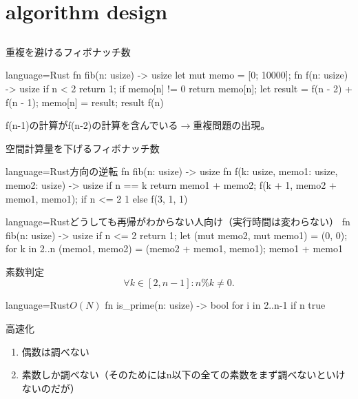 \documentclass{beamer}
\begin{document}
\section{algorithm design}		%
\subsection{}


\begin{frame}[fragile]{重複を避ける}{フィボナッチ数}
\begin{codeof}{language=Rust}{}
fn fib(n: usize) -> usize {
    let mut memo = [0; 10000];
    fn f(n: usize) -> usize {
        if n < 2 { return 1; }
        if memo[n] != 0 { return memo[n]; }
        let result = f(n - 2) + f(n - 1);
        memo[n] = result;
        result
    }
    f(n)
}
\end{codeof}
f(n-1)の計算がf(n-2)の計算を含んでいる$\to$重複問題の出現。

\end{frame}

\begin{frame}[fragile]{空間計算量を下げる}{フィボナッチ数}
\begin{codeof}{language=Rust}{方向の逆転}
fn fib(n: usize) -> usize {
    fn f(k: usize, memo1: usize, memo2: usize) -> usize{
        if n == k { return memo1 + memo2; } 
        f(k + 1, memo2 + memo1, memo1);
    }
    if n <= 2 { 1 } else { f(3, 1, 1) }
}
\end{codeof}

\begin{codeof}{language=Rust}{どうしても再帰がわからない人向け（実行時間は変わらない）}
fn fib(n: usize) -> usize {
    if n <= 2 { return 1; }
    let (mut memo2, mut memo1) = (0, 0);
    for k in 2..n {
        (memo1, memo2) = (memo2 + memo1, memo1);
    }
    memo1 + memo1
}
\end{codeof}
\end{frame}

\begin{frame}[fragile]{素数判定}{}
\[
\forall k \in [2, n-1] : n \% k \ne 0.
\]

\begin{codeof}{language=Rust}{$O(N)$}
fn is_prime(n: usize) -> bool {
    for i in 2..n-1 {
        if n %
    }
    true
}
\end{codeof}
高速化
\begin{enumerate}%
\item 偶数は調べない
\item 素数しか調べない（そのためにはn以下の全ての素数をまず調べないといけないのだが）
\end{enumerate}
\end{frame}
\end{document}
